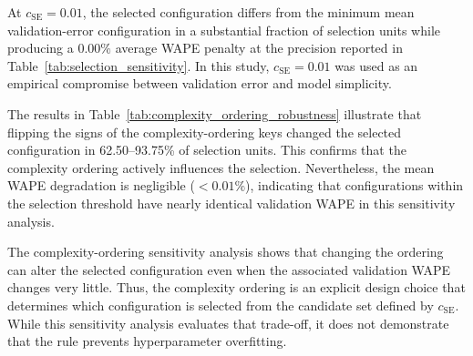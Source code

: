 At \(c_{\mathrm{SE}} = 0.01\), the selected configuration differs from the minimum mean validation-error configuration in a substantial fraction of selection units while producing a \(0.00\%\) average WAPE penalty at the precision reported in Table~\ref{tab:selection_sensitivity}.
In this study, \(c_{\mathrm{SE}} = 0.01\) was used as an empirical compromise between validation error and model simplicity.




The results in Table~\ref{tab:complexity_ordering_robustness} illustrate that flipping the signs of the complexity-ordering keys changed the selected configuration in 62.50--93.75\% of selection units.
This confirms that the complexity ordering actively influences the selection.
Nevertheless, the mean WAPE degradation is negligible (\(<0.01\%\)), indicating that configurations within the selection threshold have nearly identical validation WAPE in this sensitivity analysis.



The complexity-ordering sensitivity analysis shows that changing the ordering can alter the selected configuration even when the associated validation WAPE changes very little.
Thus, the complexity ordering is an explicit design choice that determines which configuration is selected from the candidate set defined by \(c_{\mathrm{SE}}\).
While this sensitivity analysis evaluates that trade-off, it does not demonstrate that the rule prevents hyperparameter overfitting.
